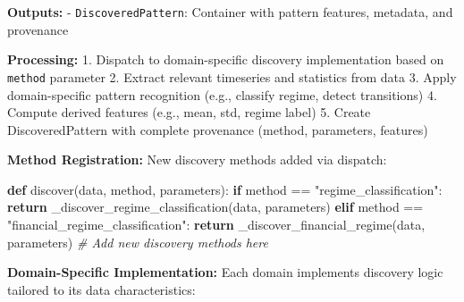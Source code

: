 \documentclass[
]{article}
\newenvironment{Shaded}{}{}
\newcommand{\CommentTok}[1]{\textcolor[rgb]{0.38,0.63,0.69}{\textit{#1}}}
\newcommand{\ControlFlowTok}[1]{\textcolor[rgb]{0.00,0.44,0.13}{\textbf{#1}}}
\newcommand{\KeywordTok}[1]{\textcolor[rgb]{0.00,0.44,0.13}{\textbf{#1}}}
\newcommand{\NormalTok}[1]{#1}
\newcommand{\OperatorTok}[1]{\textcolor[rgb]{0.40,0.40,0.40}{#1}}
\newcommand{\StringTok}[1]{\textcolor[rgb]{0.25,0.44,0.63}{#1}}
\begin{document}
\textbf{Outputs:} - \texttt{DiscoveredPattern}: Container with pattern
features, metadata, and provenance

\textbf{Processing:} 1. Dispatch to domain-specific discovery
implementation based on \texttt{method} parameter 2. Extract relevant
timeseries and statistics from data 3. Apply domain-specific pattern
recognition (e.g., classify regime, detect transitions) 4. Compute
derived features (e.g., mean, std, regime label) 5. Create
DiscoveredPattern with complete provenance (method, parameters,
features)

\textbf{Method Registration:} New discovery methods added via dispatch:

\begin{Shaded}
\begin{Highlighting}[]
\KeywordTok{def}\NormalTok{ discover(data, method, parameters):}
    \ControlFlowTok{if}\NormalTok{ method }\OperatorTok{==} \StringTok{"regime\_classification"}\NormalTok{:}
        \ControlFlowTok{return}\NormalTok{ \_discover\_regime\_classification(data, parameters)}
    \ControlFlowTok{elif}\NormalTok{ method }\OperatorTok{==} \StringTok{"financial\_regime\_classification"}\NormalTok{:}
        \ControlFlowTok{return}\NormalTok{ \_discover\_financial\_regime(data, parameters)}
    \CommentTok{\# Add new discovery methods here}
\end{Highlighting}
\end{Shaded}

\textbf{Domain-Specific Implementation:} Each domain implements
discovery logic tailored to its data characteristics:
\end{document}
